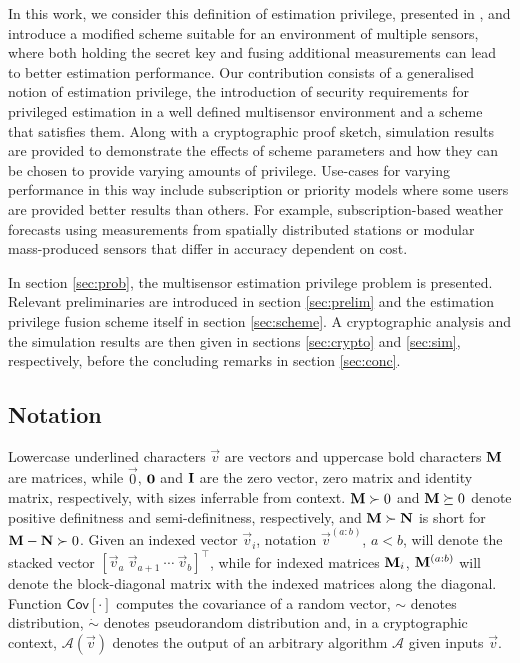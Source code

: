 \documentclass[conference]{IEEEtran}
\theoremstyle{definition}
\theoremstyle{remark}
\begin{document}
In this work, we consider this definition of estimation privilege, presented in \cite{risticCryptographicallyPrivilegedState2022}, and introduce a modified scheme suitable for an environment of multiple sensors, where both holding the secret key and fusing additional measurements can lead to better estimation performance. Our contribution consists of a generalised notion of estimation privilege, the introduction of security requirements for privileged estimation in a well defined multisensor environment and a scheme that satisfies them. Along with a cryptographic proof sketch, simulation results are provided to demonstrate the effects of scheme parameters and how they can be chosen to provide varying amounts of privilege. Use-cases for varying performance in this way include subscription or priority models where some users are provided better results than others. For example, subscription-based weather forecasts using measurements from spatially distributed stations or modular mass-produced sensors that differ in accuracy dependent on cost.

In section \ref{sec:prob}, the multisensor estimation privilege problem is presented. Relevant preliminaries are introduced in section \ref{sec:prelim} and the estimation privilege fusion scheme itself in section \ref{sec:scheme}. A cryptographic analysis and the simulation results are then given in sections \ref{sec:crypto} and \ref{sec:sim}, respectively, before the concluding remarks in section \ref{sec:conc}.

% 
% 

\subsection{Notation}\label{subsec:notation}
Lowercase underlined characters $\vec{v}$ are vectors and uppercase bold characters ${{\mathbf{M}}}$ are matrices, while $\vec{0}$, ${{\mathbf{0}}}$ and ${{\mathbf{I}}}$ are the zero vector, zero matrix and identity matrix, respectively, with sizes inferrable from context. ${{\mathbf{M}}}\succ 0$ and ${{\mathbf{M}}}\succeq 0$ denote positive definitness and semi-definitness, respectively, and ${{\mathbf{M}}}\succ {\ensuremath{{\mathbf{N}}}}$ is short for ${{\mathbf{M}}} - {{\mathbf{N}}} \succ 0$. Given an indexed vector $\vec{v}_i$, notation $\vec{v}^{(a:b)}$, $a<b$, will denote the stacked vector $[\vec{v}_a\ \vec{v}_{a+1}\ \cdots\ \vec{v}_b]^\top$, while for indexed matrices ${{\mathbf{M}}}_i$, ${{\mathbf{M}}}^{(a:b)}$ will denote the block-diagonal matrix with the indexed matrices along the diagonal. Function $\mathsf{Cov}[\cdot]$ computes the covariance of a random vector, $\sim$ denotes distribution, $\dot{\sim}$ denotes pseudorandom distribution and, in a cryptographic context, $\mathcal{A}(\vec{v})$ denotes the output of an arbitrary algorithm $\mathcal{A}$ given inputs $\vec{v}$.
\end{document}

